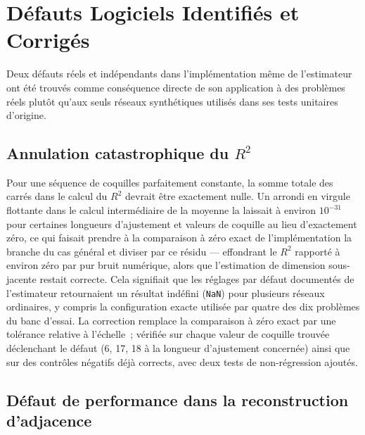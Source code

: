 \documentclass[11pt,a4paper]{article}
\begin{document}
\section{Défauts Logiciels Identifiés et Corrigés}
\label{sec:defauts}

Deux défauts réels et indépendants dans l'implémentation même de
l'estimateur ont été trouvés comme conséquence directe de son application
à des problèmes réels plutôt qu'aux seuls réseaux synthétiques utilisés
dans ses tests unitaires d'origine.

\subsection{Annulation catastrophique du \texorpdfstring{$R^2$}{R2}}

Pour une séquence de coquilles parfaitement constante, la somme totale des
carrés dans le calcul du $R^2$ devrait être exactement nulle. Un
arrondi en virgule flottante dans le calcul intermédiaire de la moyenne la
laissait à environ $10^{-31}$ pour certaines longueurs d'ajustement et
valeurs de coquille au lieu d'exactement zéro, ce qui faisait prendre à la
comparaison à zéro exact de l'implémentation la branche du cas général et
diviser par ce résidu --- effondrant le $R^2$ rapporté à environ zéro par
pur bruit numérique, alors que l'estimation de dimension sous-jacente
restait correcte. Cela signifiait que les réglages par défaut documentés
de l'estimateur retournaient un résultat indéfini (\texttt{NaN}) pour
plusieurs réseaux ordinaires, y compris la configuration exacte utilisée
par quatre des dix problèmes du banc d'essai. La correction remplace la
comparaison à zéro exact par une tolérance relative à l'échelle~; vérifiée
sur chaque valeur de coquille trouvée déclenchant le défaut (6, 17, 18 à
la longueur d'ajustement concernée) ainsi que sur des contrôles négatifs
déjà corrects, avec deux tests de non-régression ajoutés.

\subsection{Défaut de performance dans la reconstruction d'adjacence}
\end{document}
